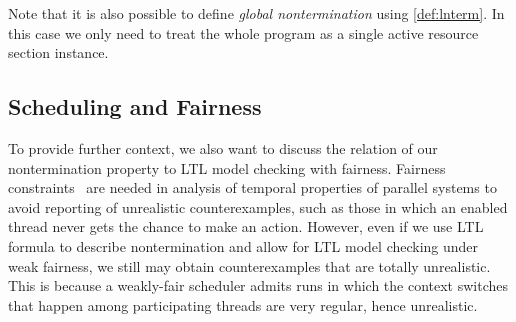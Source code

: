 % 


Note that it is also possible to define \emph{global nontermination} using
\autoref{def:lnterm}. In this case we only need to treat the whole
program as a single active resource section instance.



\subsection{Scheduling and Fairness} \label{sec:fairness}

To provide further context, we also want to discuss the relation of our
nontermination property to LTL model checking with fairness.  Fairness
constraints~ are needed in analysis of temporal
properties of parallel systems to avoid reporting of unrealistic
counterexamples, such as those in which an enabled thread never gets the chance
to make an action. However, even if we use LTL formula to
describe nontermination and allow for LTL model checking under weak fairness, we
still may obtain counterexamples that are totally unrealistic. This is because a
weakly-fair scheduler
admits runs in which the context switches that happen among participating
threads are very regular, hence unrealistic.

